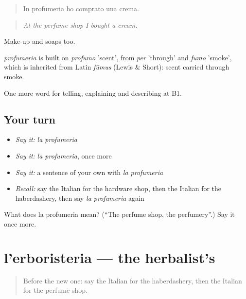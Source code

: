 \begin{quote}
In profumeria ho comprato una crema.
\end{quote}

\begin{quote}
\emph{At the perfume shop I bought a cream.}
\end{quote}

Make-up and soaps too.

\begin{cousinweb}
\emph{profumeria} is built on \emph{profumo} 'scent', from \emph{per} 'through' and \emph{fumo} 'smoke', which is inherited from Latin \emph{fūmus} (Lewis \& Short): scent carried through smoke.
\end{cousinweb}

\begin{grammarlens}[title={What you've built}]
One more word for telling, explaining and describing at B1.
\end{grammarlens}

\subsection*{Your turn}
\begin{itemize}
\raggedright
  \item \emph{Say it:} \emph{la profumeria}
  \item \emph{Say it:} \emph{la profumeria}, once more
  \item \emph{Say it:} a sentence of your own with \emph{la profumeria}
  \item \emph{Recall:} say the Italian for the hardware shop, then the Italian for the haberdashery, then say \emph{la profumeria} again
\end{itemize}

\begin{tcolorbox}[breakable,colback=teal!4,colframe=teal!35!black,title={Before you move on}]
What does la profumeria mean? (\textquotedblleft{}The perfume shop, the perfumery\textquotedblright{}.) Say it once more.
\end{tcolorbox}
\section[l'erboristeria]{l'erboristeria — the herbalist's}

\label{lesson:IT-C453-erboristeria}



\begin{quote}
Before the new one: say the Italian for the haberdashery, then the Italian for the perfume shop.
\end{quote}

